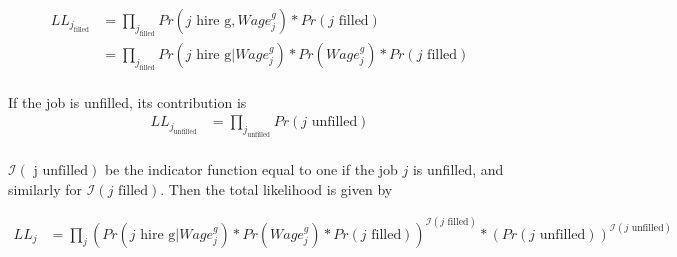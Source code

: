 \documentclass[12pt]{article}
\begin{document}
\begin{align*}
 LL_{j_{\text{filled}}} &= \prod_{j_{\text{filled}}}  Pr(\text{$j$ hire g},Wage^g_{j})*Pr(\text{$j$ filled}) \\
  &=  \prod_{j_{\text{filled}}}  Pr(\text{$j$ hire g} | Wage^g_{j})*Pr(Wage^g_{j})*Pr( \text{$j$ filled}) \\
\end{align*}

If the job is unfilled, its contribution is
\begin{align*}
 LL_{j_{\text{unfilled}}} &= \prod_{j_{\text{unfilled}}}  Pr(\text{$j$ unfilled}) \\
\end{align*}

$\mathcal{I}( \text{ j unfilled})$ be the indicator function equal to one if the job $j$ is unfilled, and similarly for $\mathcal{I}(\text{$j$ filled})$. Then the total likelihood is given by

\begin{align*}
LL_j  &=  \prod_j ( Pr(\text{$j$ hire g} | Wage^g_{j})*Pr(Wage^g_{j})*Pr( \text{$j$ filled}))^{\mathcal{I}(\text{$j$ filled})}*(Pr(\text{$j$ unfilled}))^{\mathcal{I}(\text{$j$ unfilled})}  \\
\end{align*}






\end{document}
